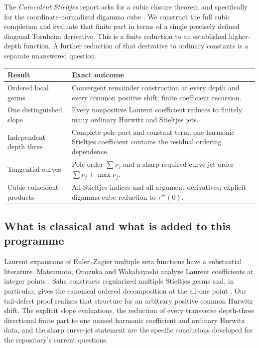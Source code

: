 The \emph{Coincident Stieltjes} report asks for a cubic closure theorem
and specifically for the coordinate-normalized digamma cube
\cite[Further research: cubic coincident moments]{repocoincident}.
We construct the full cubic completion and evaluate that finite part
in terms of a single precisely defined diagonal Tornheim derivative.
This is a finite reduction to an established higher-depth function.
A further reduction of that derivative to ordinary constants is a
separate unanswered question.

\begin{center}
\begin{tabular}{>{\raggedright\arraybackslash}p{}>{\raggedright\arraybackslash}p{}}
\toprule
Result & Exact outcome\\
\midrule
Ordered local germs & Convergent remainder construction at every depth and
every common positive shift; finite coefficient recursion.\\[4pt]
One distinguished slope & Every nonpositive Laurent coefficient reduces
to finitely many ordinary Hurwitz and Stieltjes jets.\\[4pt]
Independent depth three & Complete pole part and constant term; one
harmonic Stieltjes coefficient contains the residual ordering dependence.\\[4pt]
Tangential curves & Pole order $\sum\nu_j$ and a sharp required curve
jet order $\sum\nu_j+\max\nu_j$.\\[4pt]
Cubic coincident products & All Stieltjes indices and all argument
derivatives; explicit digamma-cube reduction to $\tau'''(0)$.\\
\bottomrule
\end{tabular}
\end{center}

\subsection{What is classical and what is added to this programme}

Laurent expansions of Euler--Zagier multiple zeta functions have a
substantial literature. Matsumoto, Onozuka and Wakabayashi analyze Laurent
coefficients at integer points \cite{MOW}. Saha constructs regularized
multiple Stieltjes germs and, in particular, gives the canonical
ordered decomposition at the all-one point \cite[Theorem 2]{Saha}.
Our tail-defect proof realizes that structure for an arbitrary
positive common Hurwitz shift. The explicit slope evaluations, the
reduction of every transverse depth-three directional finite part to
one named harmonic coefficient and ordinary Hurwitz data, and the
sharp curve-jet statement are the
specific conclusions developed for the repository's current questions.

